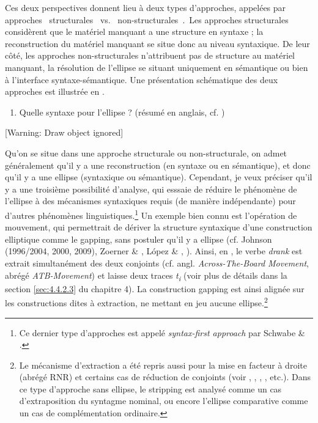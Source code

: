 Ces deux perspectives donnent lieu à deux types d'approches, appelées par \citet{Merchant2009} approches {\guillemotleft}~structurales~{\guillemotright} vs. {\guillemotleft}~non-structurales~{\guillemotright}.~Les approches structurales considèrent que le matériel manquant a une structure en syntaxe ; la reconstruction du matériel manquant se situe donc au niveau syntaxique. De leur côté, les approches non-structurales n'attribuent pas de structure au matériel manquant, la résolution de l'ellipse se situant uniquement en sémantique ou bien à l'interface syntaxe-sémantique. Une présentation schématique des deux approches est illustrée en .


\begin{enumerate}
\item \label{bkm:Ref305706464}Quelle syntaxe pour l'ellipse ? (résumé en anglais, cf. \citet{Merchant2009})  


\end{enumerate}
[Warning: Draw object ignored]

Qu'on se situe dans une approche structurale ou non-structurale, on admet généralement qu'il y a une reconstruction (en syntaxe ou en sémantique), et donc qu'il y a une ellipse (syntaxique ou sémantique). Cependant, je veux préciser qu'il y a une troisième possibilité d'analyse, qui esssaie de réduire le phénomène de l'ellipse à des mécanismes syntaxiques requis (de manière indépendante) pour d'autres phénomènes linguistiques.\footnote{Ce dernier type d'approches est appelé \textit{syntax-first approach} par Schwabe \& \citet{Winkler2003}.} Un exemple bien connu est l'opération de mouvement, qui permettrait de dériver la structure syntaxique d'une construction elliptique comme le gapping, sans postuler qu'il y a ellipse (cf. Johnson (1996/2004, 2000, 2009), Zoerner \& \citet{Agbayani2000}, López \& \citet{Winkler2003}, \citet{Winkler2005}). Ainsi, en , le verbe \textit{drank} est extrait simultanément des deux conjoints (cf. angl. \textit{Across-The-Board Movement}, abrégé \textit{ATB-Movement}) et laisse deux traces \textit{t}\textit{\textsubscript{i}} (voir plus de détails dans la section \ref{sec:4.4.2.3} du chapitre 4). La construction gapping est ainsi alignée sur les constructions dites à extraction, ne mettant en jeu aucune ellipse.\footnote{Le mécanisme d'extraction a été repris aussi pour la mise en facteur à droite (abrégé RNR) et certains cas de réduction de conjoints (voir \citet{Ross1967}, \citet{Hudson1976}, \citet{Maling1972}, \citet{Sabbagh2007}, etc.). Dans ce type d'approche sans ellipse, le stripping est analysé comme un cas d'extraposition du syntagme nominal, ou encore l'ellipse comparative comme un cas de complémentation ordinaire.}


